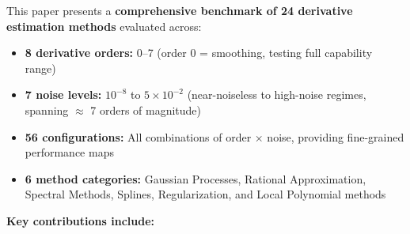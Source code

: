 This paper presents a \textbf{comprehensive benchmark of 24 derivative estimation methods} evaluated across:
\begin{itemize}
    \item \textbf{8 derivative orders:} 0--7 (order 0 = smoothing, testing full capability range)
    \item \textbf{7 noise levels:} $10^{-8}$ to $5 \times 10^{-2}$ (near-noiseless to high-noise regimes, spanning $\approx$ 7 orders of magnitude)
    \item \textbf{56 configurations:} All combinations of order $\times$ noise, providing fine-grained performance maps
    \item \textbf{6 method categories:} Gaussian Processes, Rational Approximation, Spectral Methods, Splines, Regularization, and Local Polynomial methods
\end{itemize}

\textbf{Key contributions include:}

